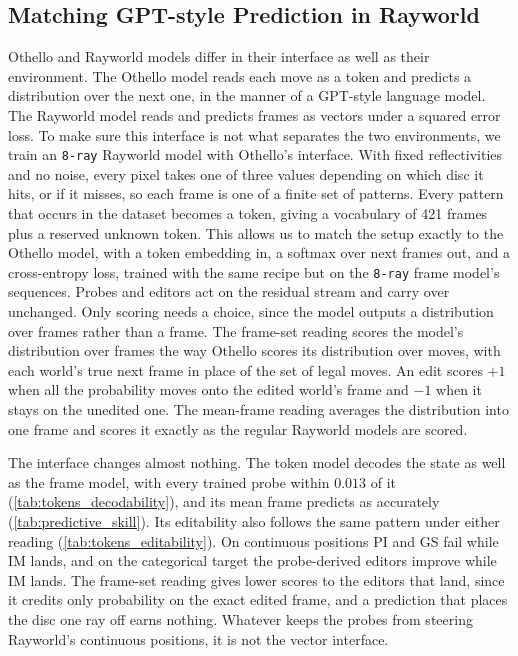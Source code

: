 \documentclass{article} %
\begin{document}
\FloatBarrier
\subsection{Matching GPT-style Prediction in Rayworld}
\label{app:tokenized_rw}

Othello and Rayworld models differ in their interface as well as their environment. The Othello model reads each move as a token and predicts a distribution over the next one, in the manner of a GPT-style language model. The Rayworld model reads and predicts frames as vectors under a squared error loss. To make sure this interface is not what separates the two environments, we train an \texttt{8-ray} Rayworld model with Othello's interface. With fixed reflectivities and no noise, every pixel takes one of three values depending on which disc it hits, or if it misses, so each frame is one of a finite set of patterns. Every pattern that occurs in the dataset becomes a token, giving a vocabulary of 421 frames plus a reserved unknown token. This allows us to match the setup exactly to the Othello model, with a token embedding in, a softmax over next frames out, and a cross-entropy loss, trained with the same recipe but on the \texttt{8-ray} frame model's sequences. Probes and editors act on the residual stream and carry over unchanged. Only scoring needs a choice, since the model outputs a distribution over frames rather than a frame. The frame-set reading scores the model's distribution over frames the way Othello scores its distribution over moves, with each world's true next frame in place of the set of legal moves. An edit scores $+1$ when all the probability moves onto the edited world's frame and $-1$ when it stays on the unedited one. The mean-frame reading averages the distribution into one frame and scores it exactly as the regular Rayworld models are scored. 

The interface changes almost nothing. The token model decodes the state as well as the frame model, with every trained probe within $0.013$ of it (\cref{tab:tokens_decodability}), and its mean frame predicts as accurately (\cref{tab:predictive_skill}). Its editability also follows the same pattern under either reading (\cref{tab:tokens_editability}). On continuous positions PI and GS fail while IM lands, and on the categorical target the probe-derived editors improve while IM lands. The frame-set reading gives lower scores to the editors that land, since it credits only probability on the exact edited frame, and a prediction that places the disc one ray off earns nothing. Whatever keeps the probes from steering Rayworld's continuous positions, it is not the vector interface.
\end{document}
